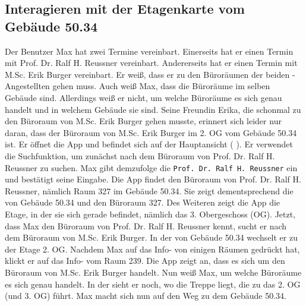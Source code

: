 \subsection{Interagieren mit der Etagenkarte vom Gebäude 50.34}

Der Benutzer Max hat zwei Termine vereinbart.
Einerseits hat er einen Termin mit Prof. Dr. Ralf H. Reussner vereinbart.
Andererseits hat er einen Termin mit M.Sc. Erik Burger vereinbart.
Er weiß, dass er zu den Büroräumen der beiden %
-Angestellten gehen muss.
Auch weiß Max, dass die Büroräume im selben Gebäude sind.
Allerdings weiß er nicht, um welche Büroräume es sich genau handelt und in welchem Gebäude sie sind.
Seine Freundin Erika, die schonmal zu den Büroraum von M.Sc. Erik Burger gehen musste, erinnert sich leider nur daran, dass der Büroraum von M.Sc. Erik Burger im 2. OG vom Gebäude 50.34 ist.
Er öffnet die App und befindet sich auf der Hauptansicht (%
).
Er verwendet die Suchfunktion, um zunächst nach dem Büroraum von Prof. Dr. Ralf H. Reussner zu suchen.
Max gibt demzufolge die %
\texttt{Prof. Dr. Ralf H. Reussner} ein und bestätigt seine Eingabe.
Die App findet den Büroraum von Prof. Dr. Ralf H. Reussner, nämlich Raum 327 im Gebäude 50.34.
Sie zeigt dementsprechend die %
von Gebäude 50.34 und den Büroraum 327.
Des Weiteren zeigt die App die Etage, in der sie sich gerade befindet, nämlich das 3. Obergeschoss (OG).
Jetzt, dass Max den Büroraum von Prof. Dr. Ralf H. Reussner kennt, sucht er nach dem Büroraum von M.Sc. Erik Burger.
In der %
von Gebäude 50.34 wechselt er zu der Etage 2. OG.
Nachdem Max auf das Info-%
von einigen Räumen gedrückt hat, klickt er auf das Info-%
vom Raum 239.
Die App zeigt an, dass es sich um den Büroraum von M.Sc. Erik Burger handelt.
Nun weiß Max, um welche Büroräume es sich genau handelt.
In der %
sieht er noch, wo die Treppe liegt, die zu das 2. OG (und 3. OG) führt.
Max macht sich nun auf den Weg zu dem Gebäude 50.34.
